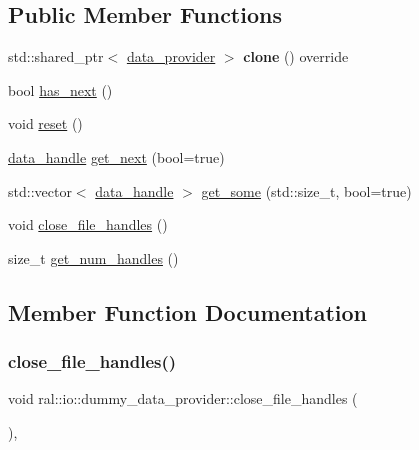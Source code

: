 \subsection*{Public Member Functions}
\begin{DoxyCompactItemize}
\item 
\mbox{\label{classral_1_1io_1_1dummy__data__provider_ab159944ce014fc2cc3f88f8963d60dc6}} 
std\+::shared\+\_\+ptr$<$ \hyperlink{classral_1_1io_1_1data__provider}{data\+\_\+provider} $>$ {\bfseries clone} () override
\item 
bool \hyperlink{classral_1_1io_1_1dummy__data__provider_a18a1c55f0a6042dfa5edc6bc0235b518}{has\+\_\+next} ()
\item 
void \hyperlink{classral_1_1io_1_1dummy__data__provider_a109b92459b919a31171a6ec00eee0eeb}{reset} ()
\item 
\hyperlink{structral_1_1io_1_1data__handle}{data\+\_\+handle} \hyperlink{classral_1_1io_1_1dummy__data__provider_a0e0f9cf9d1c6b4878236746e6c83c108}{get\+\_\+next} (bool=true)
\item 
std\+::vector$<$ \hyperlink{structral_1_1io_1_1data__handle}{data\+\_\+handle} $>$ \hyperlink{classral_1_1io_1_1dummy__data__provider_a5ceffe12bf6a535db61b30575f634c8f}{get\+\_\+some} (std\+::size\+\_\+t, bool=true)
\item 
void \hyperlink{classral_1_1io_1_1dummy__data__provider_a045c1295dc520dccc4db4cf753824e96}{close\+\_\+file\+\_\+handles} ()
\item 
size\+\_\+t \hyperlink{classral_1_1io_1_1dummy__data__provider_a05a005b12166902815522d924af87aed}{get\+\_\+num\+\_\+handles} ()
\end{DoxyCompactItemize}


\subsection{Member Function Documentation}
\mbox{\label{classral_1_1io_1_1dummy__data__provider_a045c1295dc520dccc4db4cf753824e96}} 
\subsubsection{\texorpdfstring{close\+\_\+file\+\_\+handles()}{close\_file\_handles()}}
{\footnotesize\ttfamily void ral\+::io\+::dummy\+\_\+data\+\_\+provider\+::close\+\_\+file\+\_\+handles (\begin{DoxyParamCaption}{ }\end{DoxyParamCaption})\hspace{0.3cm}{\ttfamily [inline]}, {\ttfamily [virtual]}}

